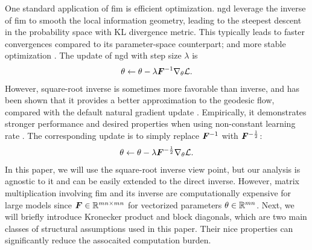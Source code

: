 One standard application of \Gls{fim} is efficient optimization. \Gls{ngd} leverage the inverse of \gls{fim} to smooth the local information geometry, leading to the steepest descent in the probability space with KL divergence metric. This typically leads to faster convergences compared to its parameter-space counterpart; and more stable optimization \citep{martens2020new}. The update of \gls{ngd} with step size $\lambda$ is
\begin{align*}
    \theta\leftarrow \theta-\lambda {\bm{F}}^{-1}\nabla_{\theta}\mathcal{L}.
\end{align*}
However, square-root inverse is sometimes more favorable than inverse, and has been shown that it provides a better approximation to the geodesic flow, compared with the default natural gradient update \cite{yang2008principal}. Empirically, it demonstrates stronger performance and desired properties when using non-constant learning rate \citep{lin2024can, loshchilov2016sgdr, bergstra2012random,choi2019empirical}. 
The corresponding update is to simply replace ${\bm{F}}^{-1}$ with ${\bm{F}}^{-\frac{1}{2}}$:
\begin{align}
    \theta\leftarrow \theta-\lambda {\bm{F}}^{-\frac{1}{2}}\nabla_{\theta}\mathcal{L}.
\end{align}
In this paper, we will use the square-root inverse view point, but our analysis is agnostic to it and can be easily extended to the direct inverse. However, matrix multiplication involving \gls{fim} and its inverse are computationally expensive for large models since ${\bm{F}}\in\mathbb{R}^{mn\times mn}$ for vectorized parameters $\theta\in\mathbb{R}^{mn}$. Next, we will briefly introduce Kronecker product and block diagonals, which are two main classes of structural assumptions used in this paper. Their nice properties can significantly reduce the assocaited computation burden. 


